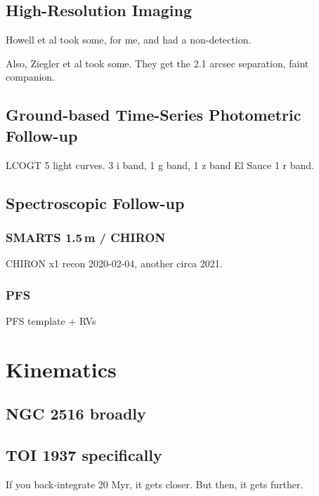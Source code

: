 \documentclass[12pt,twocolumn,tighten]{aastex63}
\begin{document}



  \subsection{High-Resolution Imaging}
  \label{subsec:speckle}
  Howell et al took some, for me, and had a non-detection.

  Also, Ziegler et al took some.
    They get the 2.1 arcsec separation, faint companion.

  \subsection{Ground-based Time-Series Photometric Follow-up}
  \label{subsec:groundphot}
  LCOGT
    5 light curves. 3 i band, 1 g band, 1 z band
  El Sauce
    1 r band.

  \subsection{Spectroscopic Follow-up}
  \label{subsec:spectra}

  \subsubsection{SMARTS 1.5$\,$m / CHIRON}
  \label{subsec:chiron}
  CHIRON x1 recon 2020-02-04, another circa 2021.

  \subsubsection{PFS}
  PFS template + RVs


\section{Kinematics}

  \subsection{NGC 2516 broadly}
  \subsection{TOI 1937 specifically}
  If you back-integrate 20 Myr, it gets closer. But then, it gets
  further.
\end{document}
